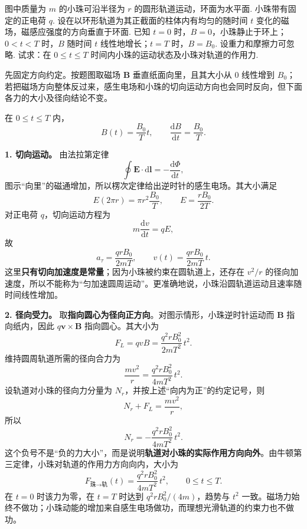 \begin{exercise}\label{ex:18.6}
图中质量为 $m$ 的小珠可沿半径为 $r$ 的圆形轨道运动，环面为水平面. 小珠带有固定的正电荷 $q$. 设在以环形轨道为其正截面的柱体内有均匀的随时间 $t$ 变化的磁场，磁感应强度的方向垂直于环面. 已知 $t=0$ 时，$B=0$，小珠静止于环上；$0 < t < T$ 时，$B$ 随时间 $t$ 线性地增长；$t=T$ 时，$B=B_0$. 设重力和摩擦力可忽略. 试求：在 $0 \le t \le T$ 时间内小珠的运动状态及小珠对轨道的作用力.
\begin{center}
\end{center}
\end{exercise}
\begin{solution}
先固定方向约定。按题图取磁场 $\boldsymbol B$ 垂直纸面向里，且其大小从 $0$ 线性增到 $B_0$；若把磁场方向整体反过来，感生电场和小珠的切向运动方向也会同时反向，但下面各力的大小及径向结论不变。

在 $0\le t\le T$ 内，
\[
B(t)=\frac{B_0}{T}t,\qquad
\frac{\mathrm{d}B}{\mathrm{d}t}=\frac{B_0}{T}.
\]

\textbf{1. 切向运动。}
由法拉第定律
\[
\oint\boldsymbol E\cdot\mathrm{d}\boldsymbol l
=-\frac{\mathrm{d}\Phi}{\mathrm{d}t},
\]
图示“向里”的磁通增加，所以楞次定律给出逆时针的感生电场。其大小满足
\[
E(2\pi r)=\pi r^2\frac{B_0}{T},
\qquad
E=\frac{rB_0}{2T}.
\]
对正电荷 $q$，切向运动方程为
\[
m\frac{\mathrm{d}v}{\mathrm{d}t}=qE,
\]
故
\[
a_\tau=\frac{qrB_0}{2mT},\qquad
v(t)=\frac{qrB_0}{2mT}\,t.
\]
这里\textbf{只有切向加速度是常量}；因为小珠被约束在圆轨道上，还存在 $v^2/r$ 的径向加速度，所以不能称为“匀加速圆周运动”。更准确地说，小珠沿圆轨道运动且速率随时间线性增加。

\textbf{2. 径向受力。}
取\textbf{指向圆心为径向正方向}。对图示情形，小珠逆时针运动而 $\boldsymbol B$ 指向纸内，因此
$q\boldsymbol v\times\boldsymbol B$ 指向圆心。其大小为
\[
F_L=qvB
=\frac{q^2rB_0^2}{2mT^2}\,t^2.
\]
维持圆周轨道所需的径向合力为
\[
\frac{mv^2}{r}
=\frac{q^2rB_0^2}{4mT^2}\,t^2.
\]
设轨道对小珠的径向力分量为 $N_r$，并按上述“向内为正”的约定记号，则
\[
N_r+F_L=\frac{mv^2}{r},
\]
所以
\[
N_r=-\frac{q^2rB_0^2}{4mT^2}\,t^2.
\]
这个负号不是“负的力大小”，而是说明\textbf{轨道对小珠的实际作用方向向外}。由牛顿第三定律，小珠对轨道的作用力方向向内，大小为
\[
\boxed{F_{\text{珠}\to\text{轨}}(t)
=\frac{q^2rB_0^2}{4mT^2}\,t^2},
\qquad 0\le t\le T.
\]
在 $t=0$ 时该力为零，在 $t=T$ 时达到 $q^2rB_0^2/(4m)$，趋势与 $t^2$ 一致。磁场力始终不做功；小珠动能的增加来自感生电场做功，而理想光滑轨道的约束力也不做功。
\end{solution}

